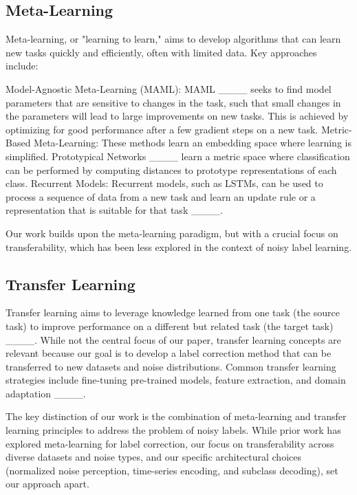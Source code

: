 \subsection{Meta-Learning}
\label{sec:related_meta}

Meta-learning, or "learning to learn," aims to develop algorithms that can learn new tasks quickly and efficiently, often with limited data. Key approaches include:

Model-Agnostic Meta-Learning (MAML): MAML ____ seeks to find model parameters that are sensitive to changes in the task, such that small changes in the parameters will lead to large improvements on new tasks. This is achieved by optimizing for good performance after a few gradient steps on a new task.
Metric-Based Meta-Learning: These methods learn an embedding space where learning is simplified.  Prototypical Networks ____ learn a metric space where classification can be performed by computing distances to prototype representations of each class.
Recurrent Models:  Recurrent models, such as LSTMs, can be used to process a sequence of data from a new task and learn an update rule or a representation that is suitable for that task ____.

Our work builds upon the meta-learning paradigm, but with a crucial focus on transferability, which has been less explored in the context of noisy label learning.

\subsection{Transfer Learning}
\label{sec:related_transfer}

Transfer learning aims to leverage knowledge learned from one task (the source task) to improve performance on a different but related task (the target task) ____.  While not the central focus of our paper, transfer learning concepts are relevant because our goal is to develop a label correction method that can be transferred to new datasets and noise distributions.  Common transfer learning strategies include fine-tuning pre-trained models, feature extraction, and domain adaptation ____.

The key distinction of our work is the combination of meta-learning and transfer learning principles to address the problem of noisy labels.  While prior work has explored meta-learning for label correction, our focus on transferability across diverse datasets and noise types, and our specific architectural choices (normalized noise perception, time-series encoding, and subclass decoding), set our approach apart.